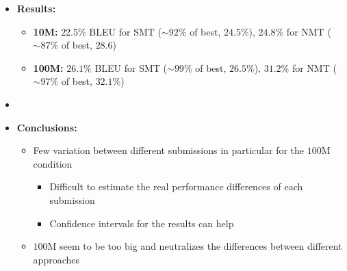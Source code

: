 \documentclass[a0]{sciposter}
\begin{document}
\begin{multicols*}{2}
\begin{itemize}
  \item {\bf Results:}
  \begin{itemize}
    \item {\bf 10M:} $22.5\%$ BLEU for SMT ($\sim92\%$ of best, $24.5\%$), $24.8\%$ for NMT ($\sim87\%$ of best, $28.6$)
    \item {\bf 100M:} $26.1\%$ BLEU for SMT ($\sim99\%$ of best, $26.5\%$), $31.2\%$ for NMT ($\sim97\%$ of best, $32.1\%$)
  \end{itemize} 
  \item[~]
  \item {\bf Conclusions:}
  \begin{itemize}
    \item Few variation between different submissions in particular for the $100$M condition
    \begin{itemize}
      \item Difficult to estimate the real performance differences of each submission
      \item Confidence intervals for the results can help
    \end{itemize}
    \item $100$M seem to be too big and neutralizes the differences between different approaches
  \end{itemize}
\end{itemize}

\end{multicols*}
\end{document}
